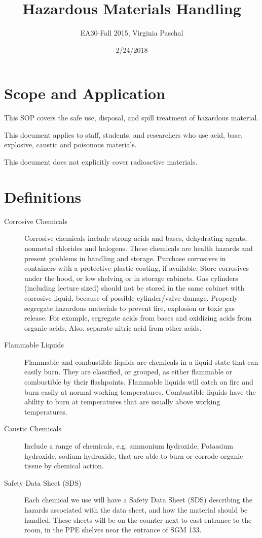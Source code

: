 \documentclass[12pt]{../SOP3}\usepackage[]{graphicx}\usepackage[]{color}
\title{Hazardous Materials Handling}
\date{2/24/2018}
\author{EA30-Fall 2015, Virginia Paschal}
\begin{document}
\maketitle

\section{Scope and Application}

\NP This SOP covers the safe use, disposal, and spill treatment of hazardous material.

\NP This document applies to staff, students, and researchers who use acid, base, explosive, caustic and poisonous materials.  

\NP This document does not explicitly cover radioactive materials. 

\tableofcontents

\newpage

\section{Definitions}

\begin{description}

  \item[Corrosive Chemicals] Corrosive chemicals include strong acids and bases, dehydrating agents, nonmetal chlorides and halogens. These chemicals are health hazards and present problems in handling and storage. Purchase corrosives in containers with a protective plastic coating, if available.  Store corrosives under the hood, or low shelving or in storage cabinets. Gas cylinders (including lecture sized) should not be stored in the same cabinet with corrosive liquid, because of possible cylinder/valve damage.  Properly segregate hazardous materials to prevent fire, explosion or toxic gas release. For example, segregate acids from bases and oxidizing acids from organic acids. Also, separate nitric acid from other acids. 

\item[Flammable Liquids] Flammable and combustible liquids are chemicals in a liquid state that can easily burn. They are classified, or grouped, as either flammable or combustible by their flashpoints. Flammable liquids will catch on fire and burn easily at normal working temperatures. Combustible liquids have the ability to burn at temperatures that are usually above working temperatures.

\item[Caustic Chemicals] Include a range of chemicals, e.g. ammonium hydroxide, Potassium hydroxide, sodium hydroxide, that are able to burn or corrode organic tissue by chemical action.

\item[Safety Data Sheet (SDS)] Each chemical we use will have a Safety Data Sheet (SDS) describing the hazards associated with the data sheet, and how the material should be handled. These sheets will be on the counter next to east entrance to the room, in the PPE shelves near the entrance of SGM 133.

\end{description}
\end{document}
